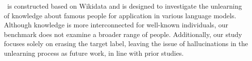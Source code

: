 

\ourdata~is constructed based on Wikidata and is designed to investigate the unlearning of knowledge about famous people for application in various language models.
Although knowledge is more interconnected for well-known individuals, our benchmark does not examine a broader range of people.
Additionally, our study focuses solely on erasing the target label, leaving the issue of hallucinations in the unlearning process as future work, in line with prior studies.

